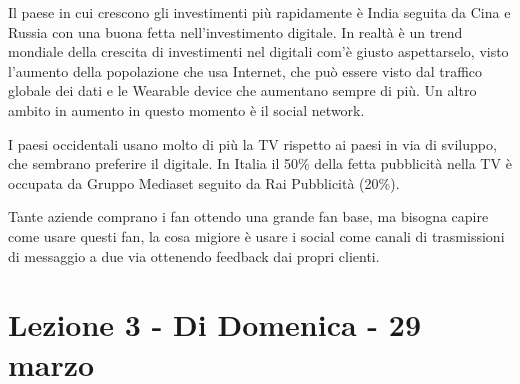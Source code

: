 \documentclass[11pt]{article}
\begin{document}
Il paese in cui crescono gli investimenti più rapidamente è India seguita da Cina e Russia con una buona fetta nell'investimento digitale.
In realtà è un trend mondiale della crescita di investimenti nel digitali com'è giusto aspettarselo, visto l'aumento della popolazione che usa Internet, che può essere visto dal traffico globale dei dati e le Wearable device che aumentano sempre di più. Un altro ambito in aumento in questo momento è il social network.

I paesi occidentali usano molto di più la TV rispetto ai paesi in via di sviluppo, che sembrano preferire il digitale. In Italia il 50\% della fetta pubblicità nella TV è occupata da Gruppo Mediaset seguito da Rai Pubblicità (20\%).

Tante aziende comprano i fan ottendo una grande fan base, ma bisogna capire come usare questi fan, la cosa migiore è usare i social come canali di trasmissioni di messaggio a due via ottenendo feedback dai propri clienti.

\section{Lezione 3 - Di Domenica - 29 marzo}
\end{document}
